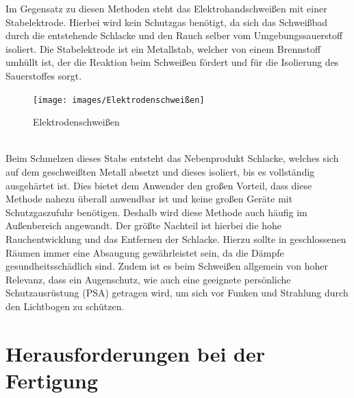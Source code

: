 Im Gegensatz zu diesen Methoden steht das Elektrohandschweißen mit
einer Stabelektrode. Hierbei wird kein Schutzgas benötigt, da sich das Schweißbad durch die entstehende Schlacke und den Rauch selber vom 
Umgebungssauerstoff isoliert. Die Stabelektrode ist ein Metallstab, welcher von einem Brennstoff umhüllt ist, der die Reaktion beim Schweißen fördert und 
für die Isolierung des Sauerstoffes sorgt.
\begin{figure}[h]
    \centering
    \texttt{[image: images/Elektrodenschweißen]}
    \caption[Elektrodenschweißen]{Elektrodenschweißen \autocite{E-Hand}}
    \label{fig:Elektrodenschweißen}
\end{figure}
\\Beim Schmelzen dieses Stabs entsteht das Nebenprodukt Schlacke, welches sich auf dem geschweißten Metall 
absetzt und dieses isoliert, bis es vollständig ausgehärtet ist.  Dies bietet dem Anwender den großen Vorteil, dass diese Methode nahezu überall anwendbar
ist und keine großen Geräte mit Schutzgaszufuhr benötigen. Deshalb wird diese Methode auch häufig im Außenbereich angewandt. Der größte Nachteil ist 
hierbei die hohe Rauchentwicklung und das Entfernen der Schlacke. Hierzu sollte in geschlossenen Räumen immer eine Absaugung gewährleistet sein, da die
Dämpfe gesundheitsschädlich sind.  Zudem ist es beim Schweißen allgemein von hoher Relevanz, dass ein Augenschutz, wie auch eine geeignete persönliche 
Schutzausrüstung (PSA) getragen wird, um sich vor Funken und Strahlung durch den Lichtbogen zu schützen. \autocite{Spath.2023}
\clearpage

\section{Herausforderungen bei der Fertigung}


